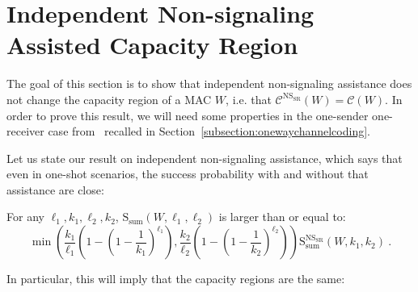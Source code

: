   \section{Independent Non-signaling Assisted Capacity Region}
  \label{section:NSsr}
The goal of this section is to show that independent non-signaling assistance does not change the capacity region of a MAC $W$, i.e. that $\mathcal{C}^{\mathrm{NS}_{\mathrm{SR}}}(W)=\mathcal{C}(W)$. In order to prove this result, we will need some properties in the one-sender one-receiver case from~\cite{BF18} recalled in Section~\ref{subsection:onewaychannelcoding}.

Let us state our result on independent non-signaling assistance, which says that even in one-shot scenarios, the success probability with and without that assistance are close:

\begin{theorem}
  \label{theo:NSsr}
  For any $\ell_1,k_1,\ell_2,k_2$, $\mathrm{S}_{\text{sum}}(W,\ell_1,\ell_2)$ is larger than or equal to:
  \[ \min\left(\frac{k_1}{\ell_1}\left(1-\left(1-\frac{1}{k_1}\right)^{\ell_1}\right),\frac{k_2}{\ell_2}\left(1-\left(1-\frac{1}{k_2}\right)^{\ell_2}\right)\right)\mathrm{S}_{\text{sum}}^{\mathrm{NS}_{\mathrm{SR}}}(W,k_1,k_2)\ . \]
\end{theorem}

In particular, this will imply that the capacity regions are the same:

